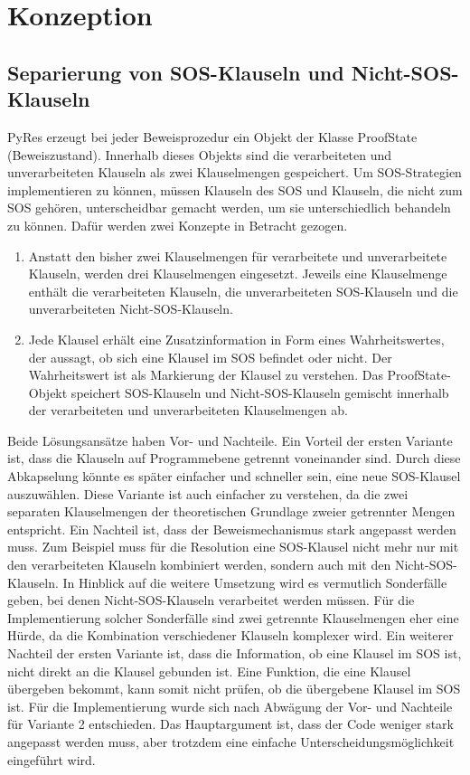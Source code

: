 
\chapter{Konzeption}

\section{Separierung von SOS-Klauseln und Nicht-SOS-Klauseln}

PyRes erzeugt bei jeder Beweisprozedur ein Objekt der Klasse ProofState (Beweiszustand). Innerhalb dieses Objekts sind die verarbeiteten und unverarbeiteten Klauseln als zwei Klauselmengen gespeichert. Um SOS-Strategien implementieren zu können, müssen Klauseln des SOS und Klauseln, die nicht zum SOS gehören, unterscheidbar gemacht werden, um sie unterschiedlich behandeln zu können. Dafür werden zwei Konzepte in Betracht gezogen.
\begin{enumerate}
	\item Anstatt den bisher zwei Klauselmengen für verarbeitete und unverarbeitete Klauseln, werden drei Klauselmengen eingesetzt. Jeweils eine Klauselmenge enthält die verarbeiteten Klauseln, die unverarbeiteten SOS-Klauseln und die unverarbeiteten Nicht-SOS-Klauseln.
	\item Jede Klausel erhält eine Zusatzinformation in Form eines Wahrheitswertes, der aussagt, ob sich eine Klausel im SOS befindet oder nicht. Der Wahrheitswert ist als Markierung der Klausel zu verstehen. Das ProofState-Objekt speichert SOS-Klauseln und Nicht-SOS-Klauseln gemischt innerhalb der verarbeiteten und unverarbeiteten Klauselmengen ab.
\end{enumerate}
Beide Lösungsansätze haben Vor- und Nachteile. Ein Vorteil der ersten Variante ist, dass die Klauseln auf Programmebene getrennt voneinander sind. Durch diese Abkapselung könnte es später einfacher und schneller sein, eine neue SOS-Klausel auszuwählen. Diese Variante ist auch einfacher zu verstehen, da die zwei separaten Klauselmengen der theoretischen Grundlage zweier getrennter Mengen entspricht. Ein Nachteil ist, dass der Beweismechanismus stark angepasst werden muss. Zum Beispiel muss für die Resolution eine SOS-Klausel nicht mehr nur mit den verarbeiteten Klauseln kombiniert werden, sondern auch mit den Nicht-SOS-Klauseln. In Hinblick auf die weitere Umsetzung wird es vermutlich Sonderfälle geben, bei denen Nicht-SOS-Klauseln verarbeitet werden müssen. Für die Implementierung solcher Sonderfälle sind zwei getrennte Klauselmengen eher eine Hürde, da die Kombination verschiedener Klauseln komplexer wird. Ein weiterer Nachteil der ersten Variante ist, dass die Information, ob eine Klausel im SOS ist, nicht direkt an die Klausel gebunden ist. Eine Funktion, die eine Klausel übergeben bekommt, kann somit nicht prüfen, ob die übergebene Klausel im SOS ist.
Für die Implementierung wurde sich nach Abwägung der Vor- und Nachteile für Variante 2 entschieden. Das Hauptargument ist, dass der Code weniger stark angepasst werden muss, aber trotzdem eine einfache Unterscheidungsmöglichkeit eingeführt wird.

